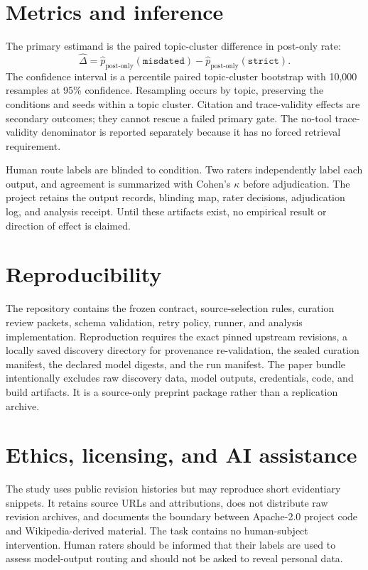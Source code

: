 \documentclass[11pt]{article}
\begin{document}
\section{Metrics and inference}

The primary estimand is the paired topic-cluster difference in post-only rate:
\[
\widehat{\Delta}=\widehat{p}_{\mathrm{post\mbox{-}only}}(\texttt{misdated})-
\widehat{p}_{\mathrm{post\mbox{-}only}}(\texttt{strict}).
\]
The confidence interval is a percentile paired topic-cluster bootstrap with 10,000 resamples at 95\% confidence. Resampling occurs by topic, preserving the conditions and seeds within a topic cluster. Citation and trace-validity effects are secondary outcomes; they cannot rescue a failed primary gate. The no-tool trace-validity denominator is reported separately because it has no forced retrieval requirement.

Human route labels are blinded to condition. Two raters independently label each output, and agreement is summarized with Cohen's $\kappa$ before adjudication. The project retains the output records, blinding map, rater decisions, adjudication log, and analysis receipt. Until these artifacts exist, no empirical result or direction of effect is claimed.



\section{Reproducibility}

The repository contains the frozen contract, source-selection rules, curation review packets, schema validation, retry policy, runner, and analysis implementation. Reproduction requires the exact pinned upstream revisions, a locally saved discovery directory for provenance re-validation, the sealed curation manifest, the declared model digests, and the run manifest. The paper bundle intentionally excludes raw discovery data, model outputs, credentials, code, and build artifacts. It is a source-only preprint package rather than a replication archive.

\section{Ethics, licensing, and AI assistance}

The study uses public revision histories but may reproduce short evidentiary snippets. It retains source URLs and attributions, does not distribute raw revision archives, and documents the boundary between Apache-2.0 project code and Wikipedia-derived material. The task contains no human-subject intervention. Human raters should be informed that their labels are used to assess model-output routing and should not be asked to reveal personal data.
\end{document}
